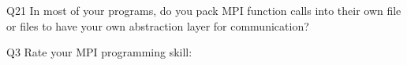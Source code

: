 \begin{description}%
\item{Q21} In most of your programs, do you pack MPI function calls into their own file or files to have your own abstraction layer for communication?%
\item{Q3} Rate your MPI programming skill:%
\end{description}%
